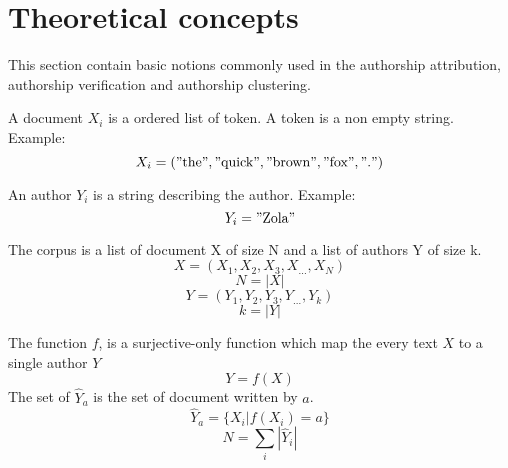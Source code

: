 \section{Theoretical concepts}

This section contain basic notions commonly used in the authorship attribution, authorship verification and authorship clustering.

\begin{definition}[Document]
  A document $X_i$ is a ordered list of token. A token is a non empty string. Example:
  \begin{equation}
    X_i = ("\text{the}", "\text{quick}", "\text{brown}", "\text{fox}", "\text{.}")
  \end{equation}
\end{definition}

\begin{definition}[Author]
  An author $Y_i$ is a string describing the author. Example:
  \begin{equation}
    Y_i = "\text{Zola}"
  \end{equation}
\end{definition}

\begin{definition}[Corpus]
  The corpus is a list of document X of size N and a list of authors Y of size k.
  \begin{equation}
    X = (X_1, X_2, X_3, X_{...}, X_N)
  \end{equation}
  \begin{equation}
    N = |X|
  \end{equation}
  \begin{equation}
    Y = (Y_1, Y_2, Y_3, Y_{...}, Y_k)
  \end{equation}
  \begin{equation}
    k = |Y|
  \end{equation}
\end{definition}

\begin{definition}
  The function $f$, is a surjective-only function which map the every text $X$ to a single author $Y$
  \begin{equation}
    Y = f(X)
  \end{equation}
  The set of $\hat{Y}_a$ is the set of document written by $a$.
  \begin{equation}
    \hat{Y}_a = \{X_i | f(X_i) = a\}
  \end{equation}
  \begin{equation}
    N = \sum_{i} |\hat{Y}_i|
  \end{equation}
\end{definition}

